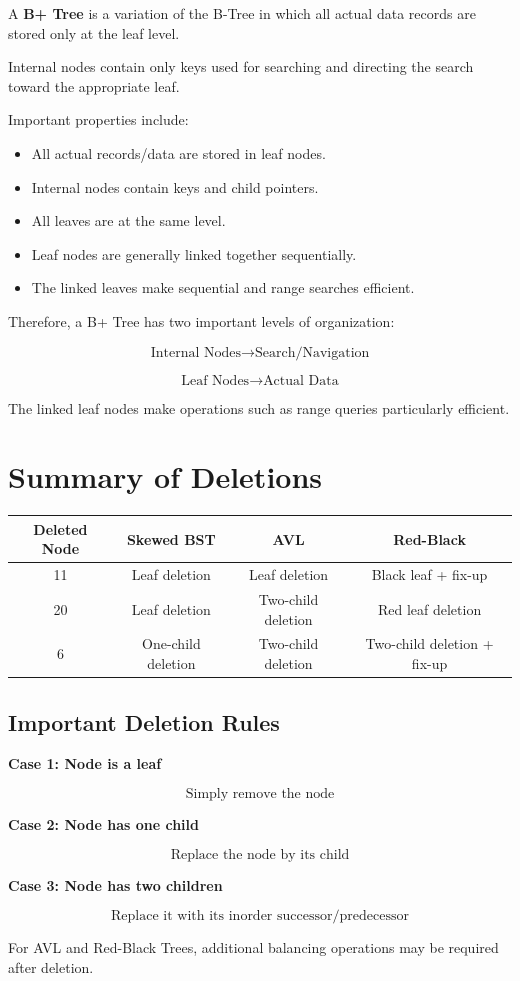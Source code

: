 \documentclass[12pt,a4paper]{article}
\begin{document}
A \textbf{B+ Tree} is a variation of the B-Tree in which all actual data records are stored only at the leaf level.

Internal nodes contain only keys used for searching and directing the search toward the appropriate leaf.

Important properties include:

\begin{itemize}
    \item All actual records/data are stored in leaf nodes.
    \item Internal nodes contain keys and child pointers.
    \item All leaves are at the same level.
    \item Leaf nodes are generally linked together sequentially.
    \item The linked leaves make sequential and range searches efficient.
\end{itemize}

Therefore, a B+ Tree has two important levels of organization:

\[
\boxed{\text{Internal Nodes} \rightarrow \text{Search/Navigation}}
\]

\[
\boxed{\text{Leaf Nodes} \rightarrow \text{Actual Data}}
\]

The linked leaf nodes make operations such as range queries particularly efficient.

\section{Summary of Deletions}

\begin{center}
\begin{tabular}{|c|c|c|c|}
\hline
\textbf{Deleted Node} & \textbf{Skewed BST} & \textbf{AVL} & \textbf{Red-Black} \\
\hline
11 & Leaf deletion & Leaf deletion & Black leaf + fix-up \\
\hline
20 & Leaf deletion & Two-child deletion & Red leaf deletion \\
\hline
6 & One-child deletion & Two-child deletion & Two-child deletion + fix-up \\
\hline
\end{tabular}
\end{center}

\subsection*{Important Deletion Rules}

\textbf{Case 1: Node is a leaf}

\[
\boxed{\text{Simply remove the node}}
\]

\textbf{Case 2: Node has one child}

\[
\boxed{\text{Replace the node by its child}}
\]

\textbf{Case 3: Node has two children}

\[
\boxed{\text{Replace it with its inorder successor/predecessor}}
\]

For AVL and Red-Black Trees, additional balancing operations may be required after deletion.
\end{document}
